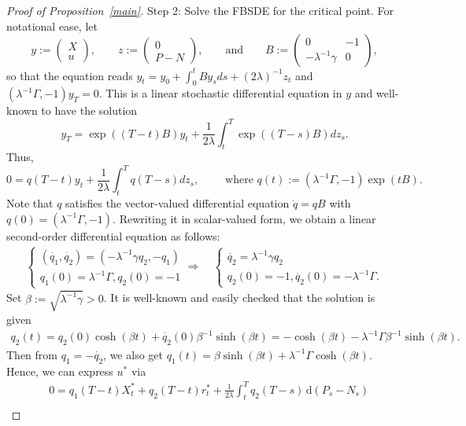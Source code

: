 \documentclass[openany,oneside]{article}
\theoremstyle{definition}
\theoremstyle{remark}
\newcommand{\ts}{\textstyle}
\newcommand{\de}{\,\mathrm{d}}
\begin{document}
\begin{proof}[Proof of Proposition~\ref{main}]
Step 2: Solve the FBSDE for the critical point. For notational ease, let
\[
 y:=\begin{pmatrix} X \\ u\end{pmatrix},\qquad z:=\begin{pmatrix} 0 \\ P-N\end{pmatrix},\qquad\text{and}\qquad B:=\begin{pmatrix} 0 & -1 \\ -\lambda^{-1}\gamma & 0\end{pmatrix},
\]
so that the equation reads $y_t = y_0 + \int_0^t B y_s ds + (2\lambda)^{-1}z_t$ and $(\lambda^{-1}\Gamma, -1)y_T = 0$. This is a linear stochastic differential equation in $y$ and well-known to have the solution
\[
\ts y_T = \exp((T-t)B)y_t + \frac{1}{2\lambda} \int_t^T \exp((T-s)B) dz_s.
\]
Thus,
\[
\ts 0 = q(T-t)y_t + \frac{1}{2\lambda}\int_t^T q(T-s) dz_s,\qquad \textrm{ where } q(t):=(\lambda^{-1}\Gamma, -1)\exp(tB).
\]
Note that $q$ satisfies the vector-valued differential equation $\dot{q}=qB$ with $q(0)=(\lambda^{-1}\Gamma, -1)$. Rewriting it in scalar-valued form, we obtain a linear second-order differential equation as follows:
\begin{align*}
\begin{cases} (\dot{q_1},\dot{q_2})=(-\lambda^{-1}\gamma q_2, -q_1) \\ q_1(0)=\lambda^{-1}\Gamma, q_2(0)=-1 \end{cases}
\Rightarrow\quad \begin{cases}
\ddot{q_2}=\lambda^{-1}\gamma q_2 \\ q_2(0)=-1, \dot{q_2}(0)=-\lambda^{-1}\Gamma.
\end{cases}
\end{align*}
Set $\beta:=\sqrt{\lambda^{-1}\gamma}>0$. It is well-known and easily checked that the solution is given%
\begin{align*}
q_2(t)=q_2(0)\cosh(\beta t)+\dot{q_2}(0)\beta^{-1}\sinh(\beta t) = -\cosh(\beta t)-\lambda^{-1}\Gamma\beta^{-1}\sinh(\beta t).
\end{align*}
Then from $q_1=-\dot{q_2}$, we also get $q_1(t)=\beta\sinh(\beta t)+\lambda^{-1}\Gamma\cosh(\beta t)$. Hence, we can express $u^\ast$ via
\begin{align*}
&\ts 0=q_1(T-t)X^\ast_t+q_2(T-t)r^\ast_t+\frac{1}{2\lambda}\int_t^T q_2(T-s) \de (P_s-N_s) \\

\end{align*}
\end{proof}
\end{document}
